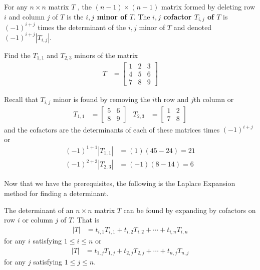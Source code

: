 \begin{definition}
For any $n\times n$ matrix $T$ , the $(n - 1)\times(n - 1)$ matrix formed by deleting row $i$ and column $j$ of $T$ is the \textbf{$i,j$ minor of $T$}. The \textbf{$i,j$ cofactor $T_{i,j}$ of $T$} is $(-1)^{i+j}$ times the determinant of the $i, j$ minor of $T$ and denoted $(-1)^{i+j} |T_{i,j}|$.
\end{definition}

\begin{example}
Find the $T_{1,1}$ and $T_{2,3}$ minors of the matrix
%
\begin{align*}
T & = \begin{bmatrix}
1 & 2 & 3 \\
4 & 5 & 6 \\
7 & 8 & 9
\end{bmatrix}
\end{align*}

\solution

Recall that $T_{i,j}$ minor is found by removing the $i$th row and $j$th column or
%
\begin{align*}
T_{1,1} & = \begin{bmatrix}
5 & 6 \\
8 & 9
\end{bmatrix} & T_{2,3} & = \begin{bmatrix}
1 & 2 \\
7 & 8
\end{bmatrix}
\end{align*}
and the cofactors are the determinants of each of these matrices times $(-1)^{i+j}$ or
%
\begin{align*}
(-1)^{1+1} |T_{1,1}| &= (1) (45-24) = 21 \\
(-1)^{2+3} |T_{2,3}| & = (-1) (8-14) = 6
\end{align*}
\end{example}

Now that we have the prerequisites, the following is the Laplace Expansion method for finding a determinant.

\begin{theorem}
The determinant of an $n \times n$ matrix $T$ can be found by expanding by cofactors on row $i$ or column $j$ of $T$.  That is
%
\begin{align*}
|T| & = t_{i,1} T_{i,1} + t_{i,2} T_{i,2} + \cdots + t_{i,n} T_{i,n}
\end{align*}
for any $i$ satisfying $1 \leq i \leq n$ or
\begin{align*}
|T| & = t_{1,j} T_{1,j} + t_{2,j} T_{2,j} + \cdots + t_{n,j} T_{n,j}
\end{align*}
for any $j$ satisfying $1 \leq j \leq n$.
\end{theorem}

